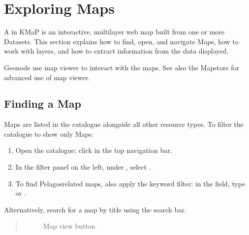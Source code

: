 \documentclass[letterpaper,10pt,english]{sphinxmanual}
\begin{document}
\sphinxstepscope


\chapter{Exploring Maps}
\label{\detokenize{04_exploring_maps:exploring-maps}}\label{\detokenize{04_exploring_maps:maps-en}}\label{\detokenize{04_exploring_maps::doc}}
\sphinxAtStartPar
A  in KMaP is an interactive, multi\sphinxhyphen{}layer web map built from one or more Datasets.
This section explains how to find, open, and navigate Maps, how to work with layers, and
how to extract information from the data displayed.

\sphinxAtStartPar
Geonode use  map viewer to interact with the maps.
See also the Mapstore  for advanced use of map viewer.


\section{Finding a Map}
\label{\detokenize{04_exploring_maps:finding-a-map}}
\sphinxAtStartPar
Maps are listed in the catalogue alongside all other resource types. To filter the
catalogue to show only Maps:
\begin{enumerate}
%
\item {} 
\sphinxAtStartPar
Open the catalogue: click  in the top navigation bar.

\item {} 
\sphinxAtStartPar
In the filter panel on the left, under , select .

\item {} 
\sphinxAtStartPar
To find Pelagos\sphinxhyphen{}related maps, also apply the keyword filter:
in the  field, type  or .

\end{enumerate}

\sphinxAtStartPar
Alternatively, search for a map by title using the search bar.
\begin{quote}

\begin{figure}[htbp]
\centering
\capstart

\noindent{}
\caption{Map view button}\label{\detokenize{04_exploring_maps:id1}}\end{figure}
\end{quote}
\end{document}
